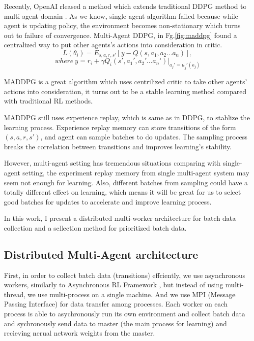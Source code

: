 \documentclass[11pt,twocolumn]{jarticle} %
\begin{document}
Recently, OpenAI rleased a method which extends traditional DDPG method to multi-agent domain \cite{maddpg}. As we know, single-agent algorithm failed because while agent is updating policy, the environment becomes non-stationary which turns out to failure of convergence. Multi-Agent DDPG, in Fg.\ref{fig:maddpg} found a centralized way to put other agents's actions into consideration in critic.
\begin{equation}
L(\theta_i) = E_{s,a,r,s'}[y - Q(s, a_1, a_2 ... a_n)],  
\end{equation}
$$where\ y = r_i + \gamma{Q_i}(s', a_1', a_2' ... a_n') | _{a_j'=\mu_j'(o_j)}$$

MADDPG is a great algorithm which uses centrilized critic to take other agents' actions into consideration, it turns out to be a stable learning method compared with traditional RL methods. \par

MADDPG still uses experience replay, which is same as in DDPG, to stablize the learning process. Experience replay \cite{replay} memory can store transitions of the form $(s,a,r,s')$, and agent can sample batches to do updates. The sampling process breaks the correlation between transitions and improves learning's stability. \par

However, multi-agent setting has tremendous situations comparing with single-agent setting, the experiment replay memory from single multi-agent system may seem not enough for learning. Also, different batches from sampling could have a totally different effect on learning, which means it will be great for us to select good batches for updates to accelerate and improve learning process. \par

In this work, I present a distributed multi-worker architecture for batch data collection and a sellection method for prioritized batch data.


\subsection{Distributed Multi-Agent architecture}

First, in order to collect batch data (transitions) effciently, we use asynchronous workers, similarly to Asynchronous RL Framework \cite{a3c}, but instead of using multi-thread, we use multi-process on a single machine. And we use MPI (Message Passing Interface) for data transfer among processes. Each worker on each process is able to asychronously run its own environment and collect batch data and sychronously send data to master (the main process for learning) and recieving nerual network weights from the master. \par
\end{document}
